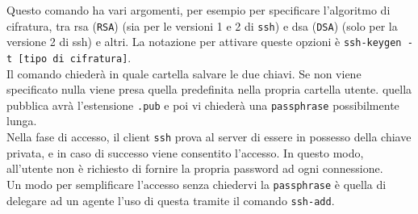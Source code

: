 Questo comando ha vari argomenti, per esempio per specificare l'algoritmo di cifratura, tra rsa (\verb*|RSA|) (sia per le versioni 1 e 2 di \verb*|ssh|) e dsa (\verb*|DSA|) (solo per la versione 2 di ssh) e altri. La notazione per attivare queste opzioni è \verb*|ssh-keygen -t [tipo di cifratura]|.\\
Il comando chiederà in quale cartella salvare le due chiavi. Se non viene specificato nulla viene presa quella predefinita nella propria cartella utente. quella pubblica avrà l'estensione \verb*|.pub| e poi vi chiederà una \verb*|passphrase| possibilmente lunga.\\
Nella fase di accesso, il client \verb*|ssh| prova al server di essere in possesso della chiave privata, e in caso di successo viene consentito l'accesso. In questo modo, all'utente non è richiesto di fornire la propria password ad ogni connessione.\\
Un modo per semplificare l'accesso senza chiedervi la \verb*|passphrase| è quella di delegare ad un agente l'uso di questa tramite il comando \verb*|ssh-add|. 

